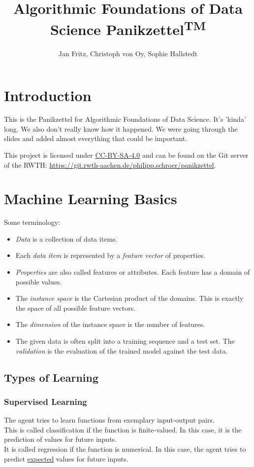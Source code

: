 \documentclass[english]{panikzettel}
\title{Algorithmic Foundations of Data Science Panikzettel\textsuperscript{\footnotesize TM}}
\author{Jan Fritz, Christoph von Oy, Sophie Hallstedt}
\begin{document}
\maketitle

\tableofcontents

\section{Introduction}
This is the Panikzettel for Algorithmic Foundations of Data Science. It's 'kinda' long. We also don't really know how it happened. We were going through the slides and added almost everything that could be important.

This project is licensed under \href{https://creativecommons.org/licenses/by-sa/4.0/}{CC-BY-SA-4.0} and can be found on the Git server of the RWTH: \url{https://git.rwth-aachen.de/philipp.schroer/panikzettel}.

\newpage

\section{Machine Learning Basics}
Some terminology:
\begin{itemize}
\item \emph{Data} is a collection of data items.
\item Each \emph{data item} is represented by a \emph{feature vector} of properties.
\item \emph{Properties} are also called features or attributes. Each feature has a domain of possible values.
\item The \emph{instance space} is the Cartesian product of the domains. This is exactly the space of all possible feature vectors.
\item The \emph{dimension} of the instance space is the number of features.
\item The given data is often split into a training sequence and a test set. The \emph{validation} is the evaluation of the trained model against the test data.
\end{itemize}

\subsection{Types of Learning}
\subsubsection{Supervised Learning}
The agent tries to learn functions from exemplary input-output pairs.\\
This is called classification if the function is finite-valued. In this case, it is the prediction of values for future inputs.\\
It is called regression if the function is numerical. In this case, the agent tries to predict \underline{expected} values for future inputs.
\end{document}
